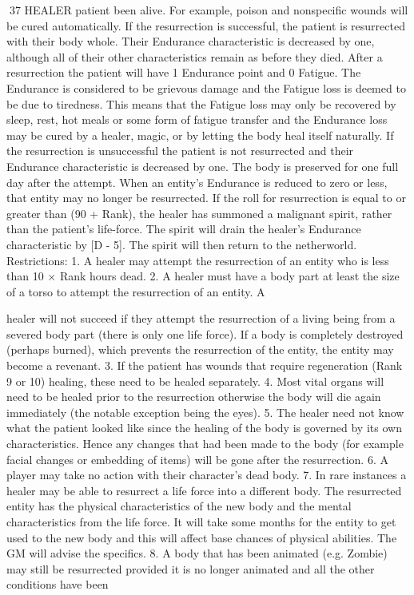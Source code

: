 \documentclass[a4paper]{article}
\begin{document}
\begin{multicols}{3}
37 HEALER
patient been alive. For example, poison and nonspecific wounds will be cured automatically.
If the resurrection is successful, the patient is resurrected with their body whole. Their Endurance
characteristic is decreased by one, although all of
their other characteristics remain as before they
died.
After a resurrection the patient will have 1 Endurance point and 0 Fatigue. The Endurance is considered to be grievous damage and the Fatigue loss is
deemed to be due to tiredness. This means that the
Fatigue loss may only be recovered by sleep, rest,
hot meals or some form of fatigue transfer and the
Endurance loss may be cured by a healer, magic, or
by letting the body heal itself naturally.
If the resurrection is unsuccessful the patient is not
resurrected and their Endurance characteristic is
decreased by one. The body is preserved for one
full day after the attempt. When an entity’s Endurance is reduced to zero or less, that entity may no
longer be resurrected.
If the roll for resurrection is equal to or greater than
(90 + Rank), the healer has summoned a malignant
spirit, rather than the patient’s life-force. The spirit
will drain the healer’s Endurance characteristic by
[D - 5]. The spirit will then return to the netherworld.
Restrictions:
1. A healer may attempt the resurrection of an
entity who is less than 10 × Rank hours dead.
2. A healer must have a body part at least the size
of a torso to attempt the resurrection of an entity. A

healer will not succeed if they attempt the resurrection of a living being from a severed body part
(there is only one life force). If a body is completely destroyed (perhaps burned), which prevents
the resurrection of the entity, the entity may become a revenant.
3. If the patient has wounds that require regeneration (Rank 9 or 10) healing, these need to be healed
separately.
4. Most vital organs will need to be healed prior to
the resurrection otherwise the body will die again
immediately (the notable exception being the
eyes).
5. The healer need not know what the patient
looked like since the healing of the body is governed by its own characteristics. Hence any
changes that had been made to the body (for example facial changes or embedding of items) will be
gone after the resurrection.
6. A player may take no action with their character’s dead body.
7. In rare instances a healer may be able to resurrect a life force into a different body. The resurrected entity has the physical characteristics of the
new body and the mental characteristics from the
life force. It will take some months for the entity to
get used to the new body and this will affect base
chances of physical abilities. The GM will advise
the specifics.
8. A body that has been animated (e.g. Zombie)
may still be resurrected provided it is no longer
animated and all the other conditions have been


\end{multicols}
\end{document}
